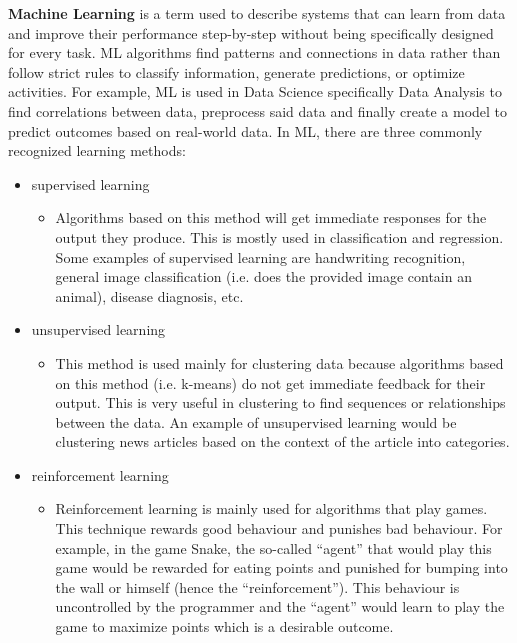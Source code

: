 \textbf{Machine Learning} is a term used to describe systems that can learn from data and improve their performance step-by-step without being specifically designed for every task. ML algorithms find patterns and connections in data rather than follow strict rules to classify information, generate predictions, or optimize activities. For example, ML is used in Data Science specifically Data Analysis to find correlations between data, preprocess said data and finally create a model to predict outcomes based on real-world data. In ML, there are three commonly recognized learning methods:
\begin{itemize}
    \item supervised learning
        \begin{itemize}
            \item Algorithms based on this method will get immediate responses for the output they produce. This is mostly used in classification and regression. Some examples of supervised learning are handwriting recognition, general image classification (i.e. does the provided image contain an animal), disease diagnosis, etc.
        \end{itemize}
    \item unsupervised learning
        \begin{itemize}
                \item This method is used mainly for clustering data because algorithms based on this method (i.e. k-means) do not get immediate feedback for their output. This is very useful in clustering to find sequences or relationships between the data. An example of unsupervised learning would be clustering news articles based on the context of the article into categories.
            \end{itemize}
    \item reinforcement learning
        \begin{itemize}
            \item Reinforcement learning is mainly used for algorithms that play games. This technique rewards good behaviour and punishes bad behaviour. For example, in the game Snake, the so-called ``agent'' that would play this game would be rewarded for eating points and punished for bumping into the wall or himself (hence the ``reinforcement''). This behaviour is uncontrolled by the programmer and the ``agent'' would learn to play the game to maximize points which is a desirable outcome.
        \end{itemize}
\end{itemize}


